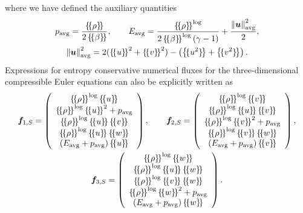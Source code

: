 \documentclass[review,onefignum,onetabnum,final]{siamart171218}
\newcommand{\nor}[1]{\left\| #1 \right\|}
\newcommand{\LRp}[1]{\left( #1 \right)}
\newcommand{\LRc}[1]{\left\{ #1 \right\}}
\newcommand{\avg}[1] {\ensuremath{\LRc{\!\{#1\}\!}}}
\begin{document}
where we have defined the auxiliary quantities 
\begin{gather}
p_{\rm avg} = \frac{\avg{\rho}}{2\avg{\beta}}, \qquad E_{\rm avg} = \frac{\avg{\rho}^{\log}}{2\avg{\beta}^{\log}\LRp{\gamma -1}}   + \frac{\nor{\bm{u}}^2_{\rm avg}}{2}, \label{eq:fluxaux} \\
 \nor{\bm{u}}^2_{\rm avg} = 2(\avg{u}^2 + \avg{v}^2) - \LRp{\avg{u^2} +\avg{v^2}} \nonumber.  
\end{gather}
Expressions for entropy conservative numerical fluxes for the three-dimensional compressible Euler equations can also be explicitly written as
\begin{gather*}
\bm{f}_{1,S} = \LRp{\begin{array}{c}
\avg{\rho}^{\log}\avg{u}\\
\avg{\rho}^{\log}\avg{u}^2 + p_{\rm avg}\\
\avg{\rho}^{\log}\avg{u}\avg{v}\\
\avg{\rho}^{\log}\avg{u}\avg{w}\\
(E_{\rm avg}+ p_{\rm avg})\avg{u}\\
\end{array}}, 
\qquad 
\bm{f}_{2,S} = \LRp{\begin{array}{c}
\avg{\rho}^{\log}\avg{v}\\
\avg{\rho}^{\log}\avg{u}\avg{v}\\
\avg{\rho}^{\log}\avg{v}^2 + p_{\rm avg}\\
\avg{\rho}^{\log}\avg{v}\avg{w}\\
(E_{\rm avg}+ p_{\rm avg})\avg{v}\\
\end{array}},\\
\bm{f}_{3,S} = \LRp{\begin{array}{c}
\avg{\rho}^{\log}\avg{w}\\
\avg{\rho}^{\log}\avg{u}\avg{w}\\
\avg{\rho}^{\log}\avg{v}\avg{w}\\
\avg{\rho}^{\log}\avg{w}^2 + p_{\rm avg}\\
(E_{\rm avg}+ p_{\rm avg})\avg{w}\\
\end{array}}.\nonumber
\end{gather*}
\end{document}
